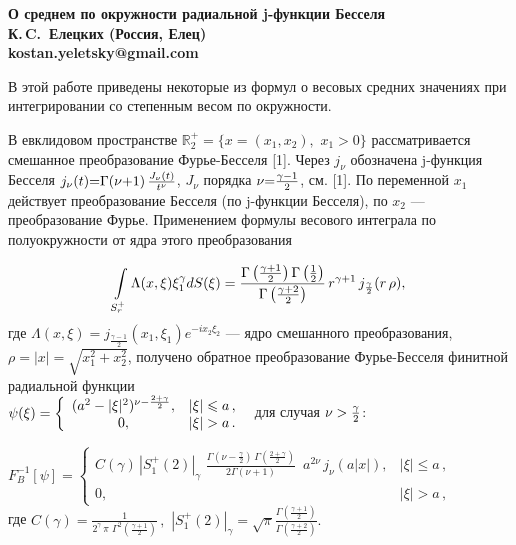 
\begin{center}
	\bf О среднем по окружности радиальной j-функции Бесселя \\
	К.\,C.~Елецких (Россия, Елец)\\
	kostan.yeletsky@gmail.com\\
\end{center}


В этой работе приведены некоторые из формул о весовых средних значениях при интегрировании со степенным весом по окружности.

В евклидовом пространстве $\mathbb{R}_2^+=\{x=(x_1,x_2),\,\,x_1>0\}$ рассматривается смешанное преобразование Фурье-Бесселя [1]. Через $j_\nu$ обозначена j-функция Бесселя
$j_\nu(t){=}
\Gamma(\nu{+}1)\,{J_\nu(t)\over t^\nu}$, $J_\nu$ порядка $\nu{=}{\gamma-1\over2}$, см. [1]. По  переменной $x_1$ действует преобразование Бесселя (по j-функции Бесселя), по $x_2$ --- преобразование Фурье. Применением  формулы  весового интеграла по полуокружности от ядра этого преобразования

$$\int\limits_{S_r^+}{\Lambda(x,\xi)\xi_1^\gamma}dS(\xi)
=\frac{\Gamma\left(\gamma+1\over2\right)\Gamma\left(1\over2\right)}{\Gamma\left(\gamma+2\over2\right)}\,r^{\gamma+1}\,j_{\frac{\gamma}{2}}(r\,\rho),$$
где $\Lambda(x,\xi)=j_\frac{\gamma-1}{2}(x_1,\xi_1)e^{-ix_2\xi_2}$ --- ядро смешанного преобразования, $\rho=|x|=\sqrt{x_1^2+x_2^2}$,
получено обратное преобразование Фурье-Бесселя финитной радиальной функции\\ $\psi(\xi)=\left\{ \begin{array}{cc}
          (a^2-|\xi|^2)^{{\nu-{2+\gamma\over2}}} , & |\xi|\leqslant a\,, \\
					   0  ,& |\xi|>a\,.
\end{array}\right.\,\,$ для случая $\nu>{\gamma\over2}$:

$F^{-1}_B[\psi]=\left\{ \begin{array}{cc}
          C(\gamma)\,|S^+_1(2)|_\gamma \,\,\frac{\Gamma\left(\nu-\frac{\gamma}{2}\right)\,\Gamma\left(\frac{2+\gamma}{2}\right)}
{2\Gamma\left(\nu+1\right)}\,\,\,a^{2\nu}\,
j_{\nu}(a|x|) , & |\xi|\leqslant a\,, \\
					   0  ,& |\xi|>a\,,
\end{array}\right.\,\,$\\
где $C(\gamma)=\frac{1}{2^{\gamma}\,\pi\,\,\Gamma^2\left(\frac{\gamma+1}{2}\right)}\,,$ $|S^+_1(2)|_\gamma=\sqrt{\pi}\frac{\Gamma(\frac{\gamma+1}{2})}{\Gamma(\frac{\gamma+2}{2})}.$

